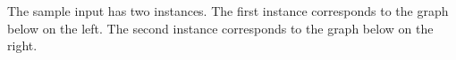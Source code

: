 \documentclass[solutionorbox,answers]{exam}
\begin{document}
\begin{questions}
The sample input has two instances. 
The first instance corresponds to the graph below on the left. 
The second instance corresponds to the graph below on the right.
\begin{center}
\begin{minipage}{0.3\linewidth}
\end{minipage}
\qquad\qquad
\begin{minipage}{0.3\linewidth}
\end{minipage}

\hfill
\end{center}

\end{questions}
\end{document}
